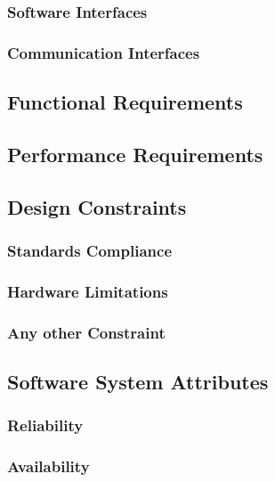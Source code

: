 \documentclass[a4paper]{article}
\begin{document}
\subsubsection{Software Interfaces}

\subsubsection{Communication Interfaces}

\subsection{Functional Requirements}

\subsection{Performance Requirements}

\subsection{Design Constraints}

\subsubsection{Standards Compliance}

\subsubsection{Hardware Limitations}

\subsubsection{Any other Constraint}

\subsection{Software System Attributes}

\subsubsection{Reliability}

\subsubsection{Availability}
\end{document}

